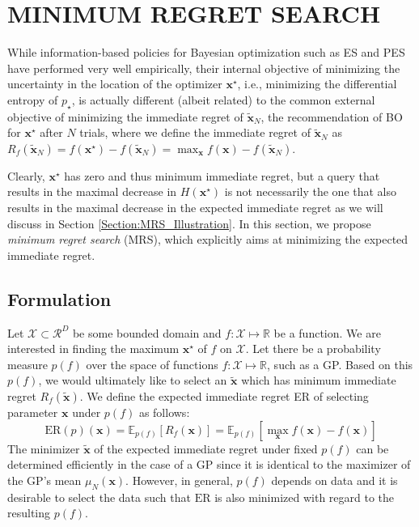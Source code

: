 \documentclass[10pt,letterpaper]{article} %
\begin{document}
\section{MINIMUM REGRET SEARCH} \label{Section:MRS}

While information-based policies for Bayesian optimization such as ES and PES
have performed very well empirically, their internal objective of minimizing
the uncertainty in the location of the optimizer $\mathbf{x}^\star$, i.e.,
minimizing the differential entropy of $p_\star$, is actually different (albeit
related) to the common external objective of minimizing the immediate regret of
$\mathbf{\tilde x}_N$, the recommendation of BO for $\mathbf{x}^\star$ after $N$
trials, where we define the immediate regret of $\mathbf{\tilde x}_N$ as
$R_f(\mathbf{\tilde  x}_N) = f(\mathbf{x}^\star) - f(\mathbf{\tilde  x}_N) = \max_{\mathbf{x}} f(\mathbf{x}) - f(\mathbf{\tilde x}_N)$.

Clearly, $\mathbf{x}^\star$ has zero and thus minimum immediate regret, but a query that
results in the maximal decrease in $H(\mathbf{x}^\star)$ is not necessarily the
one that also results in the maximal decrease in the expected immediate regret
as we will discuss in Section \ref{Section:MRS_Illustration}. In this section, we propose \emph{minimum
regret search} (MRS), which explicitly aims at minimizing the expected immediate
regret.

\subsection{Formulation}
Let $\mathcal{X} \subset \mathcal{R}^D$ be some bounded domain and $f: \mathcal{X} \mapsto
\mathbb{R}$ be a function. We are interested in finding the maximum
$\mathbf{x}^\star$ of $f$ on $\mathcal{X}$. Let there be a probability measure
$p(f)$ over the space of functions $f: \mathcal{X} \mapsto \mathbb{R}$, such as
a GP. Based on this $p(f)$, we would ultimately like to
select an $\mathbf{\tilde x}$ which has minimum immediate regret
$R_f(\mathbf{\tilde x})$. We define the expected immediate regret ER of
selecting parameter $\mathbf{x}$ under $p(f)$ as follows:
$$\text{ER}(p)(\mathbf{x}) = \mathbb{E}_{p(f)}[R_f(\mathbf{x})]
= \mathbb{E}_{p(f)}[\max_{\mathbf{x}} f(\mathbf{x}) - f(\mathbf{
x})]$$
The minimizer $\mathbf{\tilde x}$ of the expected immediate regret under fixed $p(f)$ can be determined efficiently in the case of a GP since it is identical to the maximizer of the GP's mean $\mu_N(\mathbf{x})$. However, in general, $p(f)$ depends on data and it is desirable to select the data such that $\text{ER}$ is also minimized with regard to the resulting $p(f)$.
\end{document}
